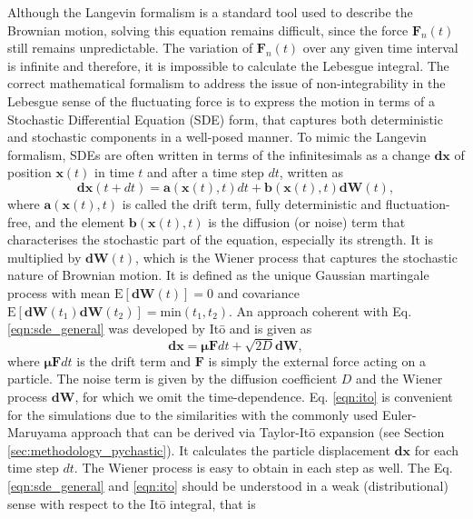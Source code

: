 \documentclass{master_thesis}
\begin{document}
Although the Langevin formalism is a standard tool used to describe the Brownian motion, solving this equation remains difficult, since the force $\boldsymbol{F}_n(t)$ still remains unpredictable. The variation of $\boldsymbol{F}_n(t)$ over any given time interval is infinite and therefore, it is impossible to calculate the Lebesgue integral. The correct mathematical formalism to address the issue of non-integrability in the Lebesgue sense of the fluctuating force is to express the motion in terms of a Stochastic Differential Equation (SDE) form, that captures both deterministic and stochastic components in a well-posed manner. To mimic the Langevin formalism, SDEs are often written in terms of the infinitesimals as a change $\boldsymbol{dx}$ of position $\boldsymbol{x}(t)$ in time $t$ and after a time step $dt$, written as
\begin{equation}
    \boldsymbol{dx}(t+dt) = \boldsymbol{a}(\boldsymbol{x}(t),t)dt + \boldsymbol{b}(\boldsymbol{x}(t),t)\boldsymbol{dW}(t),
\label{eqn:sde_general}
\end{equation}
where $\boldsymbol{a}(\boldsymbol{x}(t),t)$ is called the drift term, fully deterministic and fluctuation-free, and the element $\boldsymbol{b}(\boldsymbol{x}(t),t)$ is the diffusion (or noise) term that characterises the stochastic part of the equation, especially its strength. It is multiplied by $\boldsymbol{dW}(t)$, which is the Wiener process that captures the stochastic nature of Brownian motion. It is defined as the unique Gaussian martingale process with mean $\textrm{E}[\boldsymbol{dW}(t)]=0$ and covariance $\textrm{E}[\boldsymbol{dW}(t_1)\boldsymbol{dW}(t_2)] = \textrm{min}(t_1, t_2)$. An approach coherent with Eq. \eqref{eqn:sde_general} was developed by Itō \cite{ito1951} and is given as
\begin{equation}
    \boldsymbol{dx} = \bm{\mu} \boldsymbol{F} dt + \sqrt{2 D} \boldsymbol{dW},
\label{eqn:ito}
\end{equation}
where $\bm{\mu}\boldsymbol{F} dt$ is the drift term and $\boldsymbol{F}$ is simply the external force acting on a particle. The noise term is given by the diffusion coefficient $D$ and the Wiener process $\boldsymbol{dW}$, for which we omit the time-dependence.  Eq. \eqref{eqn:ito} is convenient for the simulations due to the similarities with the commonly used Euler-Maruyama  approach that can be derived via Taylor-Itō expansion (see Section \ref{sec:methodology_pychastic}). It calculates the particle displacement $\boldsymbol{dx}$ for each time step $dt$. The Wiener process is easy to obtain in each step as well. The Eq. \eqref{eqn:sde_general} and \eqref{eqn:ito} should be understood in a weak (distributional) sense with respect to the Itō integral, that is
\end{document}
